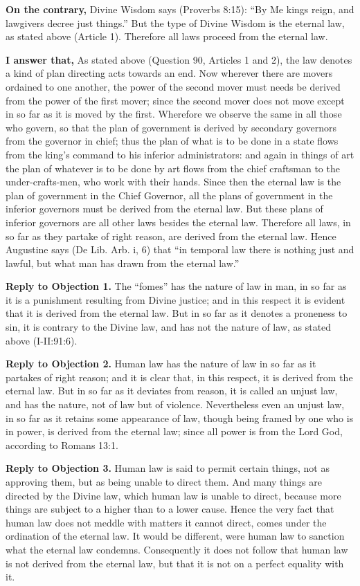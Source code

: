 \textbf{On the contrary,} Divine Wisdom says (Proverbs 8:15): ``By Me kings reign, and lawgivers decree just things.'' But the type of Divine Wisdom is the eternal law, as stated above (Article 1). Therefore all laws proceed from the eternal law.

\textbf{I answer that,} As stated above (Question 90, Articles 1 and 2), the law denotes a kind of plan directing acts towards an end. Now wherever there are movers ordained to one another, the power of the second mover must needs be derived from the power of the first mover; since the second mover does not move except in so far as it is moved by the first. Wherefore we observe the same in all those who govern, so that the plan of government is derived by secondary governors from the governor in chief; thus the plan of what is to be done in a state flows from the king's command to his inferior administrators: and again in things of art the plan of whatever is to be done by art flows from the chief craftsman to the under-crafts-men, who work with their hands. Since then the eternal law is the plan of government in the Chief Governor, all the plans of government in the inferior governors must be derived from the eternal law. But these plans of inferior governors are all other laws besides the eternal law. Therefore all laws, in so far as they partake of right reason, are derived from the eternal law. Hence Augustine says (De Lib. Arb. i, 6) that ``in temporal law there is nothing just and lawful, but what man has drawn from the eternal law.''

\textbf{Reply to Objection 1.} The ``fomes'' has the nature of law in man, in so far as it is a punishment resulting from Divine justice; and in this respect it is evident that it is derived from the eternal law. But in so far as it denotes a proneness to sin, it is contrary to the Divine law, and has not the nature of law, as stated above (I-II:91:6).

\textbf{Reply to Objection 2.} Human law has the nature of law in so far as it partakes of right reason; and it is clear that, in this respect, it is derived from the eternal law. But in so far as it deviates from reason, it is called an unjust law, and has the nature, not of law but of violence. Nevertheless even an unjust law, in so far as it retains some appearance of law, though being framed by one who is in power, is derived from the eternal law; since all power is from the Lord God, according to Romans 13:1.

\textbf{Reply to Objection 3.} Human law is said to permit certain things, not as approving them, but as being unable to direct them. And many things are directed by the Divine law, which human law is unable to direct, because more things are subject to a higher than to a lower cause. Hence the very fact that human law does not meddle with matters it cannot direct, comes under the ordination of the eternal law. It would be different, were human law to sanction what the eternal law condemns. Consequently it does not follow that human law is not derived from the eternal law, but that it is not on a perfect equality with it.

